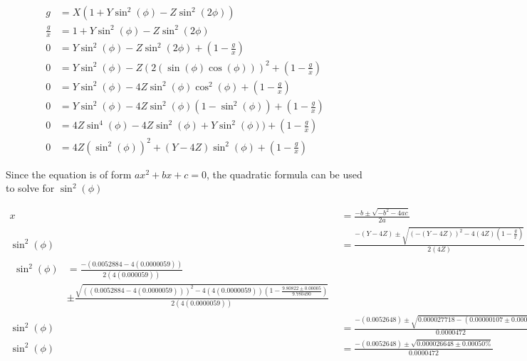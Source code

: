 \documentclass[12pt]{article}
\begin{document}
\begin{equation*}
    \begin{aligned}
        g&=X(1 + Y\sin ^2(\phi) - Z\sin ^2(2\phi))\\
        \frac{g}{x}&=1 + Y\sin ^2(\phi) - Z\sin ^2(2\phi)\\
        0&=Y\sin ^2(\phi) - Z\sin ^2(2\phi)+(1-\frac{g}{x})\\
        0&=Y\sin ^2(\phi) - Z(2(\sin(\phi)\cos(\phi)))^2+(1-\frac{g}{x})\\
        0&=Y\sin ^2(\phi) - 4Z\sin ^2(\phi)\cos ^2(\phi)+(1-\frac{g}{x})\\
        0&=Y\sin ^2(\phi) - 4Z\sin ^2(\phi)(1-\sin ^2(\phi))+(1-\frac{g}{x})\\
        0&=4Z\sin ^4(\phi) - 4Z\sin ^2(\phi)+ Y\sin ^2(\phi))+(1-\frac{g}{x})\\
        0&=4Z(\sin ^2(\phi))^2 + (Y-4Z)\sin ^2(\phi)+(1-\frac{g}{x})
    \end{aligned}
\end{equation*}

Since the equation is of form $ax^2 + bx + c =0$, the quadratic formula can be used to solve for $\sin ^2(\phi)$


    \begin{align*}
        x&= \frac{-b\pm \sqrt{-b^2-4ac}}{2a}\\
        \sin ^2(\phi)&=\frac{-(Y-4Z)\pm \sqrt{(-(Y-4Z))^2-4(4Z)(1-\frac{g}{x})}}{2(4Z)}\\
        \begin{split}
        \sin ^2(\phi)&= \frac{-(0.0052884-4(0.0000059))}{2(4(0.000059))} \\
                     &\pm \frac{ \sqrt{((0.0052884-4(0.0000059)))^2-4(4 (0.0000059))(1-\frac{9.80822\pm 0.00005}{9.780490})}}{2(4 (0.0000059))}
        \end{split}\\
        \sin ^2(\phi)&=\frac{-(0.0052648)\pm \sqrt{0.000027718-(0.00000107\pm 0.00050 \%)}}{0.0000472}\\
        \sin ^2(\phi)&=\frac{-(0.0052648)\pm \sqrt{0.000026648 \pm 0.00050 \%}}{0.0000472}\\
    \end{align*}
\end{document}
